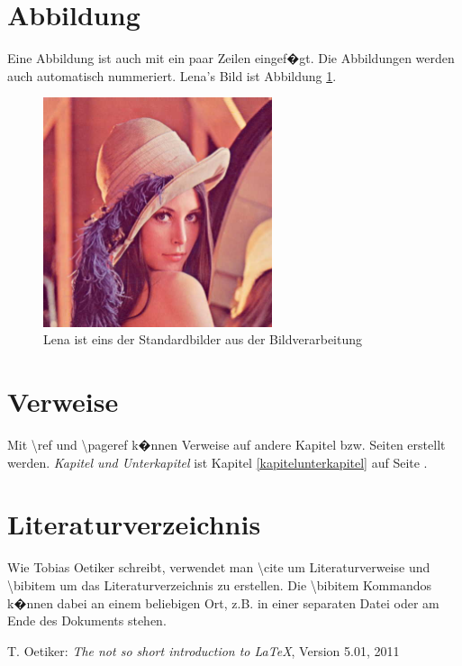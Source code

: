 \documentclass[a4paper,11pt]{report}
\begin{document}
\section{Abbildung}
Eine Abbildung ist auch mit ein paar Zeilen eingef�gt. Die Abbildungen werden auch automatisch nummeriert. Lena's Bild ist Abbildung \ref{lena}.
\begin{figure}
\begin{center}
\includegraphics[width=0.6\textwidth]{lena.jpg}
\caption{Lena ist eins der Standardbilder aus der Bildverarbeitung}
\label{lena}
\end{center}
\end{figure}

\blindtext
\section{Verweise}
Mit \textbackslash ref und \textbackslash pageref k�nnen Verweise auf andere Kapitel bzw. Seiten erstellt werden. \emph{Kapitel und Unterkapitel} ist Kapitel \ref{kapitelunterkapitel} auf Seite \pageref{kapitelunterkapitel}.

\blindtext[2]

\section{Literaturverzeichnis}
Wie Tobias Oetiker \cite{lshort} schreibt, verwendet man \textbackslash cite um Literaturverweise und \textbackslash bibitem um das Literaturverzeichnis zu erstellen. Die \textbackslash bibitem Kommandos k�nnen dabei an einem beliebigen Ort, z.B. in einer separaten Datei oder am Ende des Dokuments stehen.

\begin{thebibliography}{99}
 T. Oetiker:
\emph{The not so short introduction to \LaTeX{}}, Version 5.01, 2011
\end{thebibliography}
\end{document}
